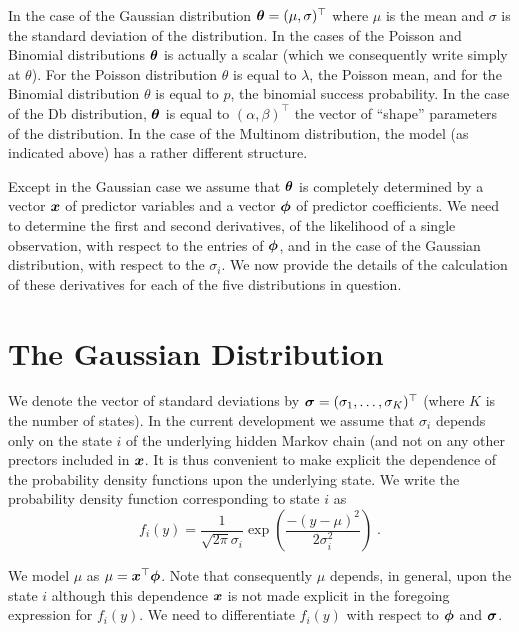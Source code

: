 In the case of the Gaussian distribution $\mbox{$\boldsymbol{\theta}$} =
(\mu,\sigma)^{\top}$ where $\mu$ is the mean and $\sigma$ is
the standard deviation of the distribution.  In the cases of the
Poisson and Binomial distributions $\mbox{$\boldsymbol{\theta}$}$ is actually a scalar
(which we consequently write simply at $\theta$).  For the Poisson
distribution $\theta$ is equal to $\lambda$, the Poisson mean,
and for the Binomial distribution $\theta$ is equal to $p$, the
binomial success probability.  In the case of the Db distribution,
$\mbox{$\boldsymbol{\theta}$}$ is equal to $(\alpha,\beta)^{\top}$ the vector of
``shape'' parameters of the distribution.  In the case of the
Multinom distribution, the model (as indicated above) has a rather
different structure.

Except in the Gaussian case we assume that $\mbox{$\boldsymbol{\theta}$}$ is completely
determined by a vector $\mbox{$\boldsymbol{x}$}$ of predictor variables and a vector
$\mbox{$\boldsymbol{\phi}$}$ of predictor coefficients.  We need to determine the first
and second derivatives, of the likelihood of a single observation,
with respect to the entries of $\mbox{$\boldsymbol{\phi}$}$, and in the case of the
Gaussian distribution, with respect to the $\sigma_i$.  We now
provide the details of the calculation of these derivatives for
each of the five distributions in question.

\section{The Gaussian Distribution}

We denote the vector of standard deviations by $\mbox{$\boldsymbol{\sigma}$} = (\sigma_1,
\ldots, \sigma_K)^{\top}$ (where $K$ is the number of states).
In the current development we assume that $\sigma_i$ depends only
on the state $i$ of the underlying hidden Markov chain (and not on
any other prectors included in $\mbox{$\boldsymbol{x}$}$.  It is thus convenient to make
explicit the dependence of the probability density functions upon
the underlying state.  We write the probability density function
corresponding to state $i$ as
\[
f_i(y) = \frac{1}{\sqrt{2\pi} \sigma_i} \exp \left (
                            \frac{-(y-\mu)^2}{2\sigma_i^2} \right ) \; .
\]

We model $\mu$ as $\mu =  \mbox{$\boldsymbol{x}$}^{\top}\mbox{$\boldsymbol{\phi}$}$.  Note that consequently
$\mu$ depends, in general, upon the state $i$ although this
dependence $\mbox{$\boldsymbol{x}$}$ is not made explicit in the foregoing expression
for $f_i(y)$.  We need to differentiate $f_i(y)$ with respect to
$\mbox{$\boldsymbol{\phi}$}$ and $\mbox{$\boldsymbol{\sigma}$}$.


